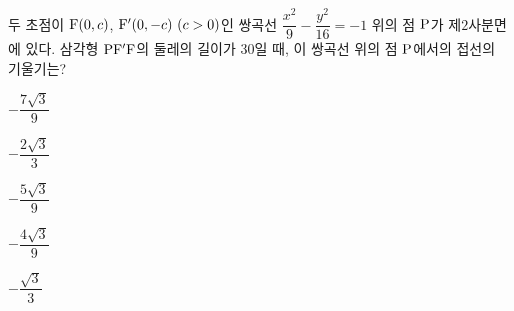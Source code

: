 두 초점이 $\mathrm{F}(0{,}\mkern3mu\mathopen{}c)$, $\pt{F'}(0{,}\mkern3mu\mathopen{}-c)\ (c>0)$인 쌍곡선 $\dfrac{x^2}{9}-\dfrac{y^2}{16}=-1$ 위의 점 $\mathrm{P}$가 제$2$사분면에 있다. 삼각형 $\mathrm{PF'F}$의 둘레의 길이가 $30$일 때, 이 쌍곡선 위의 점 $\mathrm{P}$에서의 접선의 기울기는?
\begin{choices32}{\rule[-3ex]{0pt}{8ex}$-\dfrac{7\sqrt{3}}{9}$}{\rule[-3ex]{0pt}{8ex}$-\dfrac{2\sqrt{3}}{3}$}{\rule[-3ex]{0pt}{8ex}$-\dfrac{5\sqrt{3}}{9}$}{\rule[-3ex]{0pt}{8ex}$-\dfrac{4\sqrt{3}}{9}$}{\rule[-3ex]{0pt}{8ex}$-\dfrac{\sqrt{3}}{3}$}\end{choices32}
